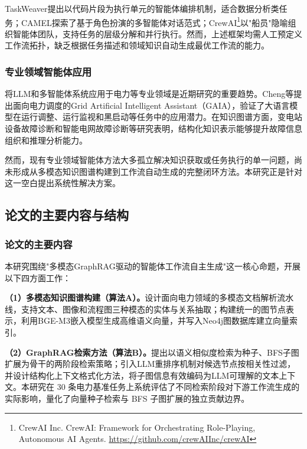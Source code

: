 TaskWeaver\cite{taskweaver2024}提出以代码片段为执行单元的智能体编排机制，适合数据分析类任务；CAMEL\cite{li2023camel}探索了基于角色扮演的多智能体对话范式；CrewAI\footnote{CrewAI Inc. CrewAI: Framework for Orchestrating Role-Playing, Autonomous AI Agents. \url{https://github.com/crewAIInc/crewAI}}以"船员"隐喻组织智能体团队，支持任务的层级分解和并行执行。然而，上述框架均需人工预定义工作流拓扑，缺乏根据任务描述和领域知识自动生成最优工作流的能力。

\subsubsection{专业领域智能体应用}

将LLM和多智能体系统应用于电力等专业领域是近期研究的重要趋势。Cheng等\cite{cheng2025gaia}提出面向电力调度的Grid Artificial Intelligent Assistant（GAIA），验证了大语言模型在运行调整、运行监视和黑启动等任务中的应用潜力。在知识图谱方面，变电站设备故障诊断\cite{xiao2022substationkg}和智能电网故障诊断\cite{yao2024smartgridkg}等研究表明，结构化知识表示能够提升故障信息组织和推理分析能力。

然而，现有专业领域智能体方法大多孤立解决知识获取或任务执行的单一问题，尚未形成从多模态知识图谱构建到工作流自动生成的完整闭环方法。本研究正是针对这一空白提出系统性解决方案。

\subsection{论文的主要内容与结构}

\subsubsection{论文的主要内容}

本研究围绕"多模态GraphRAG驱动的智能体工作流自主生成"这一核心命题，开展以下四方面工作：

\textbf{（1）多模态知识图谱构建（算法A）。}设计面向电力领域的多模态文档解析流水线，支持文本、图像和流程图三种模态的实体与关系抽取；构建统一的图节点表示，利用BGE-M3嵌入模型生成高维语义向量，并写入Neo4j图数据库建立向量索引。

\textbf{（2）GraphRAG检索方法（算法B）。}提出以语义相似度检索为种子、BFS子图扩展为骨干的两阶段检索策略；引入LLM重排序机制对候选节点按相关性过滤，并设计结构化上下文格式化方法，将子图信息有效编码为LLM可理解的文本上下文。本研究在 30 条电力基准任务上系统评估了不同检索阶段对下游工作流生成的实际影响，量化了向量种子检索与 BFS 子图扩展的独立贡献边界。

